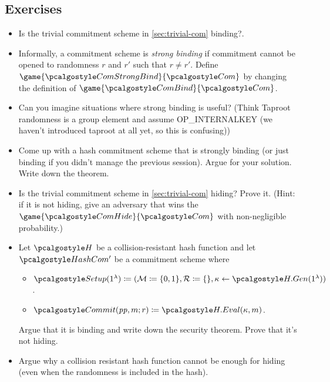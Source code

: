 \subsection{Exercises}
\begin{itemize}
  \item Is the trivial commitment scheme in \cref{sec:trivial-com} binding?.
  \item Informally, a commitment scheme is \emph{strong binding} if commitment cannot be opened to randomness $r$ and $r'$ such that $r \neq r'$. 
        Define $\game{\algo{ComStrongBind}}{\algo{Com}}$ by changing the definition of $\game{\algo{ComBind}}{\algo{Com}}$.
  \item Can you imagine situations where strong binding is useful? (Think Taproot randomness is a group element and assume OP\_INTERNALKEY (we haven't introduced taproot at all yet, so this is confusing))
  \item Come up with a hash commitment scheme that is strongly binding (or just binding if you didn't manage the previous session). Argue for your solution. Write down the theorem.
  \item Is the trivial commitment scheme in \cref{sec:trivial-com} hiding?
        Prove it.
        (Hint: if it is not hiding, give an adversary that wins the $\game{\algo{ComHide}}{\algo{Com}}$ with non-negligible probability.)
  \item Let $\algo{H}$ be a collision-resistant hash function and let $\algo{HashCom'}$ be a commitment scheme where
    \begin{itemize}
      \item $\algo{Setup}(1^\lambda) \defeq (\mathcal{M} \defeq \{0, 1\}, \mathcal{R} \defeq \{\}, \kappa \gets \algo{H.Gen}(1^\lambda))$.
      \item $\algo{Commit}(\params,m;r) \defeq  \algo{H.Eval}(\kappa, m)$.
    \end{itemize}
    Argue that it is binding and write down the security theorem.
    Prove that it's not hiding.
  \item Argue why a collision resistant hash function cannot be enough for hiding (even when the randomness is included in the hash).
\end{itemize}
